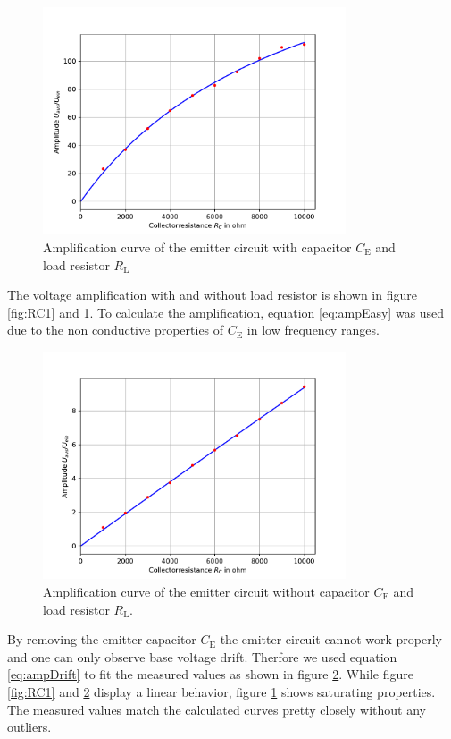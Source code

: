 \documentclass[11pt, a4paper]{article}
\begin{document}
\begin{figure}[h]
    \centering
    \includegraphics[width=0.8\textwidth]{plots/RC3.pdf}
    \caption{Amplification curve of the emitter circuit with capacitor $C_{\text{E}}$ and load resistor $R_{\text{L}}$}
    \label{fig:RC3}
\end{figure}
The voltage amplification with and without load resistor is shown in figure \ref{fig:RC1} and \ref{fig:RC3}. To calculate the amplification, equation \ref{eq:ampEasy} was used due to the non conductive properties of $C_{\text{E}}$ in low frequency ranges.
\begin{figure}[h]
    \centering
    \includegraphics[width=0.8\textwidth]{plots/RC2.pdf}
    \caption{Amplification curve of the emitter circuit without capacitor $C_{\text{E}}$ and load resistor $R_{\text{L}}.$}
    \label{fig:RC2}
\end{figure}
By removing the emitter capacitor $C_{\text{E}}$ the emitter circuit cannot work properly and one can only observe base voltage drift. Therfore we used equation \ref{eq:ampDrift} to fit the measured values as shown in figure \ref{fig:RC2}.
While figure \ref{fig:RC1} and \ref{fig:RC2} display a linear behavior, figure \ref{fig:RC3} shows saturating properties.
The measured values match the calculated curves pretty closely without any outliers.
\end{document}

